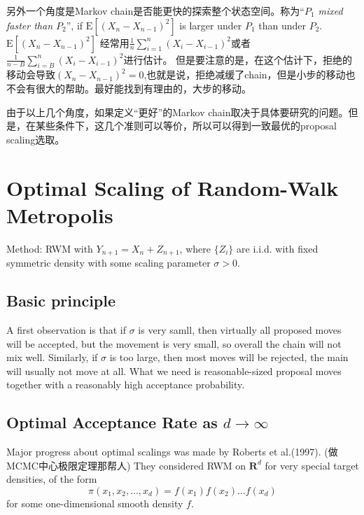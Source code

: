 \documentclass[
]{book}
\theoremstyle{definition}
\theoremstyle{definition}
\theoremstyle{definition}
\theoremstyle{remark}
\begin{document}
另外一个角度是Markov chain是否能更快的探索整个状态空间。称为``\emph{\(P_1\) mixed faster than \(P_2\)}'', if \(\mathrm{E}\left[\left(X_{n}-X_{n-1}\right)^{2}\right]\) is larger under \(P_1\) than under \(P_2\). \(\mathrm{E}\left[\left(X_{n}-X_{n-1}\right)^{2}\right]\) 经常用\(\frac{1}{n} \sum_{i=1}^{n}\left(X_{i}-X_{i-1}\right)^{2}\)或者\(\frac{1}{n-B} \sum_{i=B}^{n}\left(X_{i}-X_{i-1}\right)^{2}\)进行估计。 但是要注意的是，在这个估计下，拒绝的移动会导致\(\left(X_{n}-X_{n-1}\right)^{2}=0\),也就是说，拒绝减缓了chain，但是小步的移动也不会有很大的帮助。最好能找到有理由的，大步的移动。

由于以上几个角度，如果定义``更好''的Markov chain取决于具体要研究的问题。但是，在某些条件下，这几个准则可以等价，所以可以得到一致最优的proposal scaling选取。

\hypertarget{optimal-scaling-of-random-walk-metropolis}{%
\section{Optimal Scaling of Random-Walk Metropolis}\label{optimal-scaling-of-random-walk-metropolis}}

Method: RWM with \(Y_{n+1}=X_n+Z_{n+1}\), where \(\{Z_i\}\) are i.i.d. with fixed symmetric density with some scaling parameter \(\sigma>0\).

\hypertarget{basic-principle}{%
\subsection{Basic principle}\label{basic-principle}}

A first observation is that if \(\sigma\) is very samll, then virtually all proposed moves will be accepted, but the movement is very small, so overall the chain will not mix well. Similarly, if \(\sigma\) is too large, then most moves will be rejected, the main will usually not move at all. What we need is reasonable-sized proposal moves together with a reasonably high acceptance probability.

\hypertarget{optimal-acceptance-rate-as-drightarrow-infty}{%
\subsection{\texorpdfstring{Optimal Acceptance Rate as \(d\rightarrow \infty\)}{Optimal Acceptance Rate as d\textbackslash rightarrow \textbackslash infty}}\label{optimal-acceptance-rate-as-drightarrow-infty}}

Major progress about optimal scalings was made by Roberts et al.(1997). (做MCMC中心极限定理那帮人) They considered RWM on \(\mathbf R^d\) for very special target densities, of the form
\[
\pi\left(x_{1}, x_{2}, \ldots, x_{d}\right)=f\left(x_{1}\right) f\left(x_{2}\right) \ldots f\left(x_{d}\right)
\]
for some one-dimensional smooth density \(f\).
\end{document}
